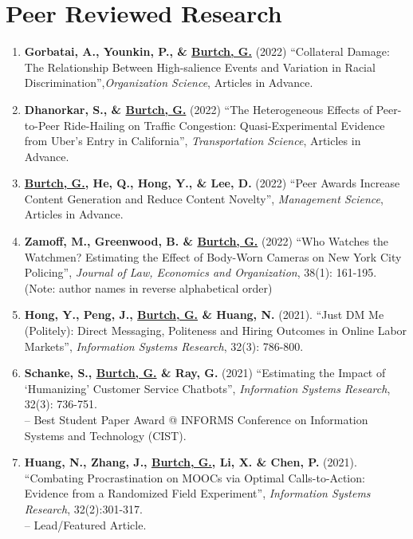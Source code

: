 \documentclass[10.5pt,letterpaper,sans]{moderncv}        %
\begin{document}
\vspace{8 pt}

\section{Peer Reviewed Research}

\smallskip

\begin{enumerate}[leftmargin=!,labelindent=5pt,itemindent=-15pt]

\item \textbf{Gorbatai, A., Younkin, P., \& \underline{Burtch, G.}} (2022) ``Collateral Damage: The Relationship Between High-salience Events and Variation in Racial Discrimination'',\textit{Organization Science}, Articles in Advance.

\item \textbf{Dhanorkar, S., \& \underline{Burtch, G.}} (2022) ``The Heterogeneous Effects of Peer-to-Peer Ride-Hailing on Traffic Congestion: Quasi-Experimental Evidence from Uber's Entry in California'', \textit{Transportation Science}, Articles in Advance.

\item \textbf{\underline{Burtch, G.}, He, Q., Hong, Y., \& Lee, D.} (2022) ``Peer Awards Increase Content Generation and Reduce Content Novelty'', \textit{Management Science}, Articles in Advance.

\item \textbf{Zamoff, M., Greenwood, B. \& \underline{Burtch, G.}} (2022) ``Who Watches the Watchmen? Estimating the Effect of Body-Worn Cameras on New York City Policing'', \textit{Journal of Law, Economics and Organization}, 38(1): 161-195. (Note: author names in reverse alphabetical order)

\item \textbf{Hong, Y., Peng, J., \underline{Burtch, G.} \& Huang, N.} (2021). ``Just DM Me (Politely): Direct Messaging, Politeness and Hiring Outcomes in Online Labor Markets'', \textit{Information Systems Research}, 32(3): 786-800.

\item \textbf{Schanke, S., \underline{Burtch, G.} \& Ray, G.} (2021) ``Estimating the Impact of `Humanizing' Customer Service Chatbots'', \textit{Information Systems Research}, 32(3): 736-751. \\-- Best Student Paper Award @ INFORMS Conference on Information Systems and Technology (CIST).

\item \textbf{Huang, N., Zhang, J., \underline{Burtch, G.}, Li, X. \& Chen, P.} (2021). ``Combating Procrastination on MOOCs via Optimal Calls-to-Action: Evidence from a Randomized Field Experiment'', \textit{Information Systems Research},  32(2):301-317. \\-- Lead/Featured Article.


\end{enumerate}
\end{document}
